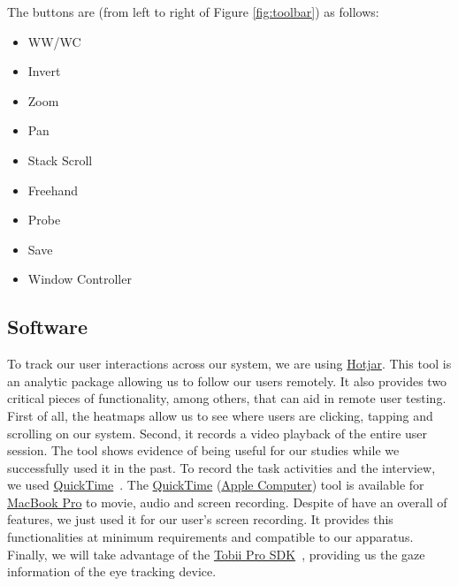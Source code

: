 \hfill


The buttons are (from left to right of Figure \ref{fig:toolbar}) as follows:

\hfill

\begin{itemize}
\item WW/WC
\item Invert
\item Zoom
\item Pan
\item Stack Scroll
\item Freehand
\item Probe
\item Save
\item Window Controller
\end{itemize}

\hfill


\subsection{Software}

To track our user interactions across our system, we are using \hyperlink{https://www.hotjar.com/}{Hotjar}. This tool is an analytic package allowing us to follow our users remotely. It also provides two critical pieces of functionality, among others, that can aid in remote user testing. First of all, the heatmaps allow us to see where users are clicking, tapping and scrolling on our system. Second, it records a video playback of the entire user session. The tool shows evidence of being useful for our studies while we successfully used it in the past. To record the task activities and the interview, we used \hyperlink{https://support.apple.com/downloads/quicktime}{QuickTime}~\cite{rowell2006internet}. The \hyperlink{https://support.apple.com/downloads/quicktime}{QuickTime} (\hyperlink{https://www.apple.com/}{Apple Computer}) tool is available for \hyperlink{https://www.apple.com/shop/buy-mac/macbook-pro}{MacBook Pro} to movie, audio and screen recording. Despite of have an overall of features, we just used it for our user's screen recording. It provides this functionalities at minimum requirements and compatible to our apparatus. Finally, we will take advantage of the \hyperlink{https://www.tobiipro.com/product-listing/tobii-pro-sdk/}{Tobii Pro SDK}~\cite{chatelain2018evaluation}, providing us the gaze information of the eye tracking device.

\clearpage